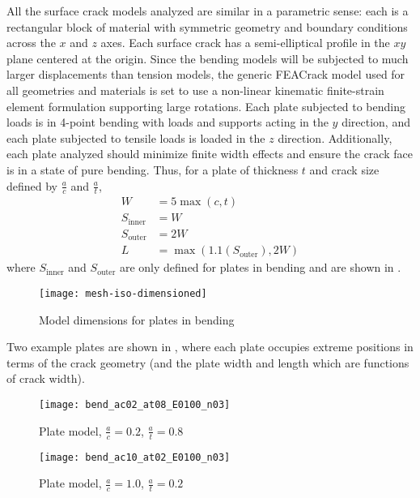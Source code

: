 All the surface crack models analyzed are similar in a parametric sense: each is a rectangular block of material with symmetric geometry and boundary conditions across the \(x\) and \(z\) axes.
Each surface crack has a semi-elliptical profile in the \(xy\) plane centered at the origin.
Since the bending models will be subjected to much larger displacements than tension models, the generic FEACrack model used for all geometries and materials is set to use a non-linear kinematic finite-strain element formulation supporting large rotations.
Each plate subjected to bending loads is in 4-point bending with loads and supports acting in the \(y\) direction, and each plate subjected to tensile loads is loaded in the \(z\) direction.
Additionally, each plate analyzed should minimize finite width effects and ensure the crack face is in a state of pure bending.
Thus, for a plate of thickness \(t\) and crack size defined by \(\frac{a}{c}\) and \(\frac{a}{t}\),
\begin{align*}
W &= 5 \max{(c, t)} \\
S_\text{inner} &= W \\
S_\text{outer} &= 2W \\
L &= \max{(1.1 (S_\text{outer}), 2W)}
\end{align*}
where \(S_\text{inner}\) and \(S_\text{outer}\)
are only defined for plates in bending and are shown in .
\begin{figure}[tbp]
\centering
\texttt{[image: mesh-iso-dimensioned]}
\caption{\label{fig:mesh-iso-dimensioned}Model dimensions for plates in bending}
\end{figure}
Two example plates are shown in , where each plate occupies extreme positions in terms of the crack geometry (and the plate width and length which are functions of crack width).
\begin{figure}[tbp]
\centering
\texttt{[image: bend\_ac02\_at08\_E0100\_n03]}
\caption{\label{fig:bend_ac02_at08_E0100_n03} Plate model, \(\frac{a}{c}=0.2\), \(\frac{a}{t}=0.8\)}
\end{figure}
\begin{figure}[tbp]
\centering
\texttt{[image: bend\_ac10\_at02\_E0100\_n03]}
\caption{\label{fig:bend_ac10_at02_E0100_n03} Plate model, \(\frac{a}{c}=1.0\), \(\frac{a}{t}=0.2\)}
\end{figure}

